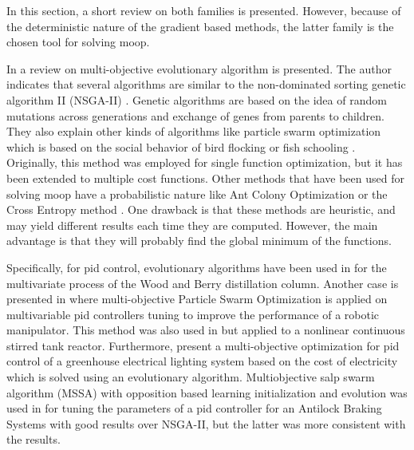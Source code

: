 In this section, a short review on both families is presented. However, because of the deterministic nature of the gradient based methods, the latter family is the chosen tool for solving \gls{moop}.

In \citet{Zhou2011} a review on multi-objective evolutionary algorithm is presented. The author indicates that several algorithms are similar to the non-dominated sorting genetic algorithm II (NSGA-II) \citep{Deb2002}. Genetic algorithms are based on the idea of random mutations across generations and exchange of genes from parents to children. They also explain other kinds of algorithms like particle swarm optimization which is based on the social behavior of bird flocking or fish schooling \citep{Eberhart1995}. Originally, this method was employed for single function optimization, but it has been extended to multiple cost functions. Other methods that have been used for solving \gls{moop} have a probabilistic nature like Ant Colony Optimization \citep{Dorigo2005} or the Cross Entropy method \citep{Rubinstein2004}. One drawback is that these methods are heuristic, and may yield different results each time they are computed. However, the main advantage is that they will probably find the global minimum of the functions.

Specifically, for \gls{pid} control, evolutionary algorithms have been used in \citet{Reynoso-Meza2012b} for the multivariate process of the Wood and Berry distillation column. Another case is presented in \citet{Pierezan2014} where multi-objective Particle Swarm Optimization is applied on multivariable \gls{pid} controllers tuning to improve the performance of a robotic manipulator. This method was also used in \citet{Tian2014} but applied to a nonlinear continuous stirred tank reactor. Furthermore, \citet{Mahdavian2014} present a multi-objective optimization for \gls{pid} control of a greenhouse electrical lighting system based on the cost of electricity which is solved using an evolutionary algorithm. Multiobjective salp swarm algorithm (MSSA) with opposition based learning initialization and evolution was used in \citet{Domingues2019} for tuning the parameters of a \gls{pid} controller for an Antilock Braking Systems with good results over NSGA-II, but the latter was more consistent with the results.

